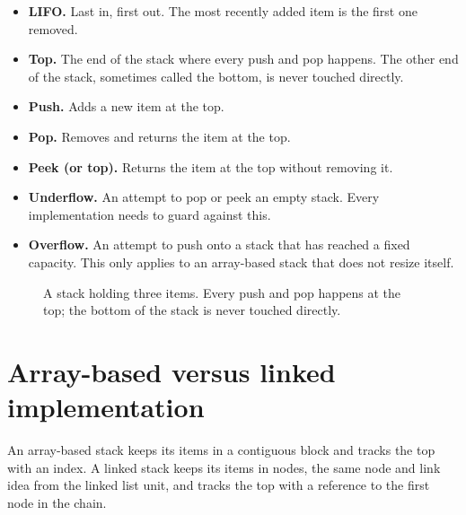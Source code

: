 \documentclass[11pt]{article}
\begin{document}
\begin{itemize}[leftmargin=1.4em]
  \item \textbf{LIFO.} Last in, first out. The most recently added item is the first one
    removed.
  \item \textbf{Top.} The end of the stack where every push and pop happens. The other end
    of the stack, sometimes called the bottom, is never touched directly.
  \item \textbf{Push.} Adds a new item at the top.
  \item \textbf{Pop.} Removes and returns the item at the top.
  \item \textbf{Peek (or top).} Returns the item at the top without removing it.
  \item \textbf{Underflow.} An attempt to pop or peek an empty stack. Every implementation
    needs to guard against this.
  \item \textbf{Overflow.} An attempt to push onto a stack that has reached a fixed
    capacity. This only applies to an array-based stack that does not resize itself.
\end{itemize}

\begin{figure}[htbp]
\centering
{}
\caption{A stack holding three items. Every push and pop happens at the top; the bottom of
the stack is never touched directly.}
\label{fig:stack-anatomy}
\end{figure}

\section{Array-based versus linked implementation}

An array-based stack keeps its items in a contiguous block and tracks the top with an
index. A linked stack keeps its items in nodes, the same node and link idea from the
linked list unit, and tracks the top with a reference to the first node in the chain.
\end{document}
